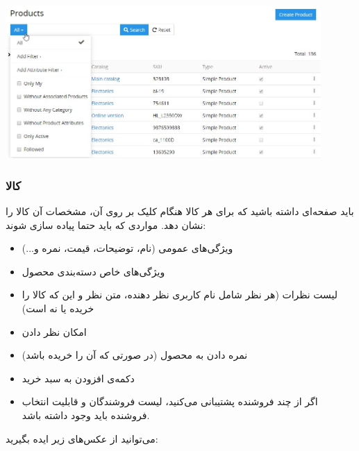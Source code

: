 \documentclass[]{article}
\begin{document}
\begin{center}
\includegraphics[width=0.9\textwidth]{images/image21.png}
\end{center}

\newpage
\subsubsection*{{\titr کالا}}

باید صفحه‌ای داشته باشید که برای هر کالا هنگام کلیک بر روی آن، مشخصات آن کالا را نشان دهد. مواردی که باید حتما پیاده سازی شوند: 
\begin{itemize}
\item
ویژگی‌های عمومی (نام، توضیحات، قیمت، نمره و...) 

\item
ویژگی‌های خاص دسته‌بندی محصول

\item
 لیست نظرات (هر نظر شامل نام کاربری نظر دهنده، متن نظر و این که کالا را خریده یا نه است)
 
 \item
امکان نظر دادن

\item
نمره دادن به محصول (در صورتی که آن را خریده باشد)

\item 
دکمه‌ی افزودن به سبد خرید

\item
اگر از چند فروشنده پشتیبانی می‌کنید، لیست فروشندگان و قابلیت انتخاب فروشنده باید وجود داشته باشد.

\end{itemize}

می‌توانید از عکس‌های زیر ایده بگیرید:
\end{document}
